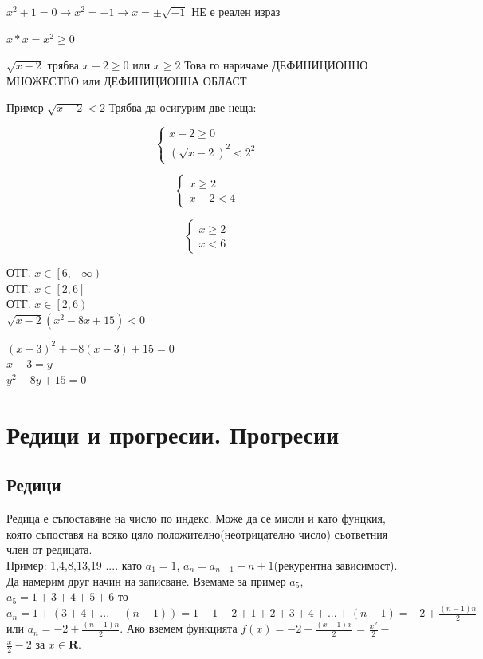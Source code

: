 \documentclass{article}
\begin{document}
\newpage
\vspace{1cm}

$x^2 + 1 = 0 \to x^2 = -1 \to x = \pm \sqrt{-1}$ НЕ е реален израз

$x*x = x^2 \geq 0 $ 



\vspace{1cm}


$\sqrt{x -2 } $ \hspace{1cm} трябва $x-2 \geq 0$ или $x \geq 2 $ Това го наричаме ДЕФИНИЦИОННО МНОЖЕСТВО или ДЕФИНИЦИОННА ОБЛАСТ


Пример $\sqrt{x -2 } < 2 $ Трябва да осигурим две неща:

	\[
\begin{cases}
 	x-2 \geq 0 \\
	(\sqrt{x-2})^2 < 2^2 
\end{cases}
\]

	\[
\begin{cases}
	x \geq 2 \\
	x-2 < 4
\end{cases}
\]



\[
\begin{cases}
	x \geq 2 \\
	x < 6
\end{cases}
\]

ОТГ. $ x \in \left[ 6, + \infty \right) $ \\
ОТГ. $ x \in \left[ 2, 6 \right] $ \\
ОТГ. $ x \in \left[ 2 , 6 \right) $ \\ 


$ \sqrt{x-2}(x^2 - 8x + 15) < 0 $


$(x-3)^2 + -8(x-3) + 15 = 0 $ \\
$x-3 = y $ \\
$y^2 - 8y + 15 = 0 $



\section{Редици и прогресии. Прогресии}

\subsection{Редици}
Редица е съпоставяне на число по индекс. Може да се мисли и като фунцкия, която съпоставя на всяко цяло положително(неотрицателно число) съответния член от редицата.  \\
Пример: 1,4,8,13,19 .... като $a_1 = 1$, $a_n = a_{n-1} + n+1 $(рекурентна зависимост). Да намерим друг начин на записване. Вземаме за пример $a_5$, 
$a_5 = 1 + 3 + 4 + 5 + 6  $  то $a_n = 1 + (3 + 4 + ...+(n-1)) = 1-1-2+1+2+3+4+...+(n-1) = -2 + \frac{(n-1)n}{2}$  или $a_n = -2 + \frac{(n-1)n}{2} $. Ако вземем функцията $f(x) = -2 + \frac{(x-1)x}{2}$ = $\frac{x^2}{2} - $$\frac{x}{2}-2$ за  $x \in \mathbf{R} $.
\end{document}
